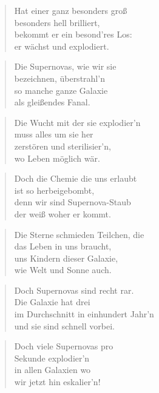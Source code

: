 \documentclass[10pt,a4paper]{article}
\begin{document}
\begin{paracol}{2}
\begin{verse}
Hat einer ganz besonders groß \\
besonders hell brilliert, \\
bekommt er ein besond’res Los: \\
er wächst und explodiert. \\
\end{verse}

\begin{verse}
Die Supernovas, wie wir sie \\
bezeichnen, überstrahl’n \\
so manche ganze Galaxie \\
als gleißendes Fanal. \\
\end{verse}

\begin{verse}
Die Wucht mit der sie explodier’n \\
muss alles um sie her \\
zerstören und sterilisier’n, \\
wo Leben möglich wär. \\
\end{verse}

\begin{verse}
Doch die Chemie die uns erlaubt \\
ist so herbeigebombt, \\
denn wir sind Supernova-Staub \\
der weiß woher er kommt. \\
\end{verse}

\begin{verse}
Die Sterne schmieden Teilchen, die \\
das Leben in uns braucht, \\
uns Kindern dieser Galaxie, \\
wie Welt und Sonne auch. \\
\end{verse}

\begin{verse}
Doch Supernovas sind recht rar. \\
Die Galaxie hat drei \\
im Durchschnitt in einhundert Jahr’n \\
und sie sind schnell vorbei. \\
\end{verse}

\begin{verse}
Doch viele Supernovas pro \\
Sekunde explodier’n \\
in allen Galaxien wo \\
wir jetzt hin eskalier’n! \\
\end{verse}


\end{paracol}
\end{document}
